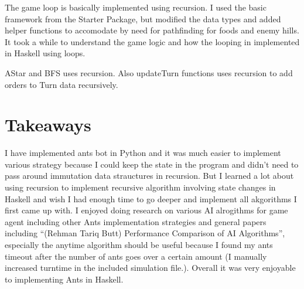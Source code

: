\documentclass[11pt]{article}
\begin{document}
The game loop is basically implemented using recursion. I used the basic framework from the Starter Package, but modified the data types and added helper functions to accomodate by need for pathfinding for foods and enemy hills. It took a while to understand the game logic and how the looping in implemented in Haskell using loops. 

AStar and BFS uses recursion. Also updateTurn functions uses recursion to add orders to Turn data recursively. 
\section{Takeaways}
\label{sec-6}


I have implemented ants bot in Python and it was much easier to implement various strategy because I could keep the state in the program and didn't need to pass around immutation data strauctures in recursion. But I learned a lot about using recursion to implement recursive algorithm involving state changes in Haskell and wish I had enough time to go deeper and implement all akgorithms I first came up with. I enjoyed doing research on various AI alrogithms for game agent including other Ants implementation strategies and general papers including ``(Rehman Tariq Butt) Performance Comparison of AI Algorithms'', especially the anytime algorithm should be useful because I found my ants timeout after the number of ants goes over a certain amount (I manually increased turntime in the included simulation file.). Overall it was very enjoyable to implementing Ants in Haskell.
\end{document}
